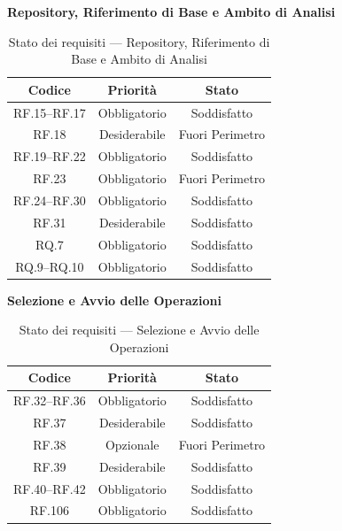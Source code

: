 \documentclass[12pt, a4paper]{article}
\begin{document}
\medskip
\noindent\textbf{Repository, Riferimento di Base e Ambito di Analisi}
\medskip

\begin{table}[H]
    \centering
    \renewcommand{\arraystretch}{1.3}
    \begin{tabular}{|c|c|c|}
        \hline
        \textbf{Codice} & \textbf{Priorità} & \textbf{Stato} \\ \hline
        RF.15--RF.17 & Obbligatorio & Soddisfatto \\ \hline
        RF.18 & Desiderabile & Fuori Perimetro \\ \hline
        RF.19--RF.22 & Obbligatorio & Soddisfatto \\ \hline
        RF.23 & Obbligatorio & Fuori Perimetro \\ \hline
        RF.24--RF.30 & Obbligatorio & Soddisfatto \\ \hline
        RF.31 & Desiderabile & Soddisfatto \\ \hline
        RQ.7 & Obbligatorio & Soddisfatto \\ \hline
        RQ.9--RQ.10 & Obbligatorio & Soddisfatto \\ \hline
    \end{tabular}
    \caption{Stato dei requisiti — Repository, Riferimento di Base e Ambito di Analisi}
    \label{tab:req-repository}
\end{table}

\medskip
\noindent\textbf{Selezione e Avvio delle Operazioni}
\medskip

\begin{table}[H]
    \centering
    \renewcommand{\arraystretch}{1.3}
    \begin{tabular}{|c|c|c|}
        \hline
        \textbf{Codice} & \textbf{Priorità} & \textbf{Stato} \\ \hline
        RF.32--RF.36 & Obbligatorio & Soddisfatto \\ \hline
        RF.37 & Desiderabile & Soddisfatto \\ \hline
        RF.38 & Opzionale & Fuori Perimetro \\ \hline
        RF.39 & Desiderabile & Soddisfatto \\ \hline
        RF.40--RF.42 & Obbligatorio & Soddisfatto \\ \hline
        RF.106 & Obbligatorio & Soddisfatto \\ \hline
    \end{tabular}
    \caption{Stato dei requisiti — Selezione e Avvio delle Operazioni}
    \label{tab:req-selezione}
\end{table}
\end{document}
